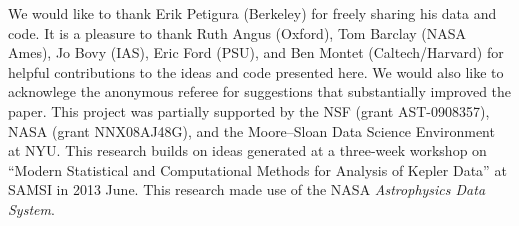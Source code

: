 \documentclass[12pt,preprint]{aastex}
\newcommand{\project}[1]{\emph{#1}}
\begin{document}
\acknowledgments
We would like to thank Erik Petigura (Berkeley) for freely sharing his data
and code.
It is a pleasure to thank
Ruth Angus (Oxford),
Tom Barclay (NASA Ames),
Jo Bovy (IAS),
Eric Ford (PSU), and
Ben Montet (Caltech/Harvard)
for helpful contributions to the ideas and code presented here.
We would also like to acknowlege the anonymous referee for suggestions that
substantially improved the paper.
This project was partially supported by the NSF (grant AST-0908357), NASA
(grant NNX08AJ48G), and the Moore--Sloan Data Science Environment at NYU.
This research builds on ideas generated at a three-week workshop on ``Modern
Statistical and Computational Methods for Analysis of Kepler Data'' at SAMSI
in 2013 June.
This research made use of the NASA \project{Astrophysics Data System}.

\newcommand{\arxiv}[1]{\href{http://arxiv.org/abs/#1}{arXiv:#1}}
\end{document}
